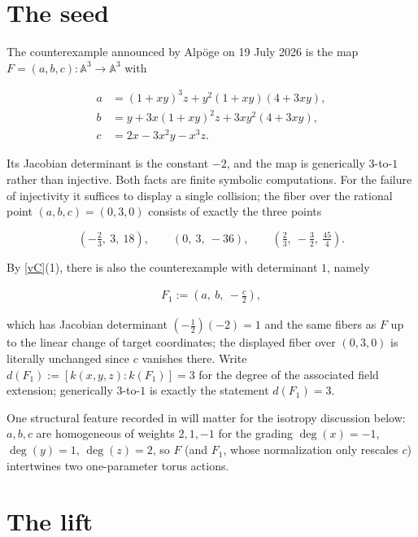 \documentclass[11pt]{article}
\theoremstyle{change}
\theoremstyle{nonumberplain}
\numberwithin{equation}{section}
\begin{document}
\section{The seed\label{seed}}

The counterexample announced by Alp\"oge on 19 July 2026 \cite{Alpoge,Speyer} is the map $F = (a,b,c): \mathbb{A}^3 \to \mathbb{A}^3$ with

\begin{align*}
a&=(1+xy)^3z+y^2(1+xy)(4+3xy),\\
b&=y+3x(1+xy)^2z+3xy^2(4+3xy),\\
c&=2x-3x^2y-x^3z.
\end{align*}

Its Jacobian determinant is the constant $-2$, and the map is generically $3$-to-$1$ rather than injective. Both facts are finite symbolic computations. For the failure of injectivity it suffices to display a single collision; the fiber over the rational point $(a,b,c) = (0,3,0)$ consists of exactly the three points

\begin{equation*}
\left( -\tfrac{2}{3},\ 3,\ 18 \right), \qquad \left( 0,\ 3,\ -36 \right), \qquad \left( \tfrac{2}{3},\ -\tfrac{3}{2},\ \tfrac{45}{4} \right).
\end{equation*}

By \cref{vC}(1), there is also the counterexample with determinant $1$, namely

\begin{align*}
F_1 := \left( a,\ b,\ -\tfrac{c}{2} \right),
\end{align*}

which has Jacobian determinant $\left(-\tfrac{1}{2}\right)(-2) = 1$ and the same fibers as $F$ up to the linear change of target coordinates; the displayed fiber over $(0,3,0)$ is literally unchanged since $c$ vanishes there. Write $d(F_1) := [k(x,y,z) : k(F_1)] = 3$ for the degree of the associated field extension; generically $3$-to-$1$ is exactly the statement $d(F_1)=3$.

One structural feature recorded in \cite{Speyer} will matter for the isotropy discussion below: $a, b, c$ are homogeneous of weights $2, 1, -1$ for the grading $\deg(x) = -1$, $\deg(y) = 1$, $\deg(z) = 2$, so $F$ (and $F_1$, whose normalization only rescales $c$) intertwines two one-parameter torus actions.

\section{The lift\label{liftsec}}
\end{document}
